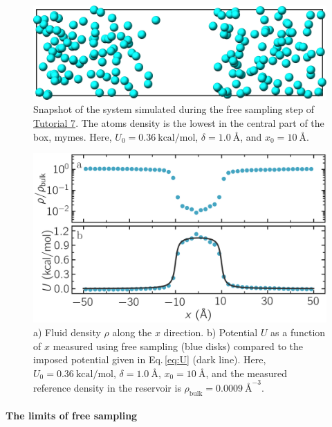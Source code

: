 \documentclass[9pt,tutorial]{livecoms}
\newcommand{\lmpcmd}[1]{\hspace{0pt}\colorbox{listing}{\textcolor{command}{\small{#1}}}\hspace{0pt}} %
\begin{document}
\begin{figure}
\centering
\includegraphics[width=\linewidth]{US-system-unbiased}
\caption{Snapshot of the system simulated during the free sampling
step of \hyperref[umbrella-sampling-label]{Tutorial 7}.
The atoms density is the lowest in the central
part of the box, \lmpcmd{mymes}.  Here,
$U_0 = 0.36~\text{kcal/mol}$, $\delta = 1.0~\text{\AA{}}$, and $x_0 = 10~\text{\AA{}}$.}
\label{fig:US-system-unbiased}
\end{figure}

\begin{figure}
\centering
\includegraphics[width=\linewidth]{US-density}
\caption{a) Fluid density $\rho$ along the $x$ direction.
b) Potential $U$ as a function of $x$ measured using free sampling (blue disks)
compared to the imposed potential given in Eq.\,\eqref{eq:U} (dark line).
Here, $U_0 = 0.36~\text{kcal/mol}$, $\delta = 1.0~\text{\AA{}}$, $x_0 = 10~\text{\AA{}}$,
and the measured reference density in the reservoir is $\rho_\text{bulk} = 0.0009~\text{\AA{}}^{-3}$.} %
\label{fig:US-density}
\end{figure}

\paragraph{The limits of free sampling}
\end{document}

